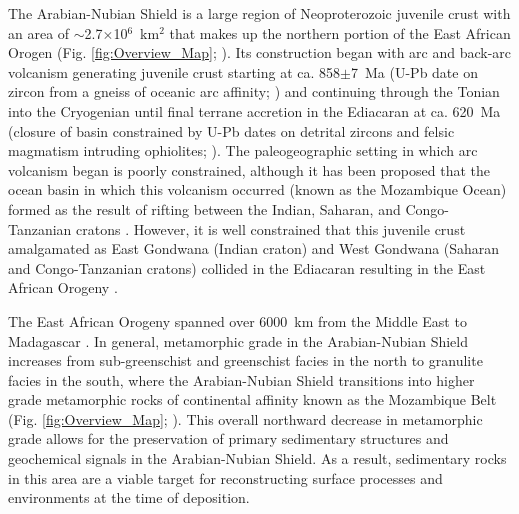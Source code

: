\documentclass[11pt,letterpaper]{article}
\begin{document}
The Arabian-Nubian Shield is a large region of Neoproterozoic juvenile crust with an area of $\sim$2.7$\times$10$^{6}$~km$^{2}$ that makes up the northern portion of the East African Orogen (Fig. \ref{fig:Overview_Map}; \citealp{Johnson2014a}). Its construction began with arc and back-arc volcanism generating juvenile crust starting at ca. 858$\pm$7~Ma (U-Pb date on zircon from a gneiss of oceanic arc affinity; \citealp{Kuster2008a}) and continuing through the Tonian into the Cryogenian until final terrane accretion in the Ediacaran at ca. 620~Ma (closure of basin constrained by U-Pb dates on detrital zircons and felsic magmatism intruding ophiolites; \citealp{Cox2012a, Johnson2014a, Cox2018a}). The paleogeographic setting in which arc volcanism began is poorly constrained, although it has been proposed that the ocean basin in which this volcanism occurred (known as the Mozambique Ocean) formed as the result of rifting between the Indian, Saharan, and Congo-Tanzanian cratons \citep{Johnson2011a}. However, it is well constrained that this juvenile crust amalgamated as East Gondwana (Indian craton) and West Gondwana (Saharan and Congo-Tanzanian cratons) collided in the Ediacaran resulting in the East African Orogeny \citep{Stern1994a, Fritz2013a}.

The East African Orogeny spanned over 6000~km from the Middle East to Madagascar \citep{Collins2002a, Johnson2014a}. In general, metamorphic grade in the Arabian-Nubian Shield increases from sub-greenschist and greenschist facies in the north to granulite facies in the south, where the Arabian-Nubian Shield transitions into higher grade metamorphic rocks of continental affinity known as the Mozambique Belt (Fig. \ref{fig:Overview_Map}; \citealp{Johnson2011a}). This overall northward decrease in metamorphic grade allows for the preservation of primary sedimentary structures and geochemical signals in the Arabian-Nubian Shield. As a result, sedimentary rocks in this area are a viable target for reconstructing surface processes and environments at the time of deposition.
\end{document}

